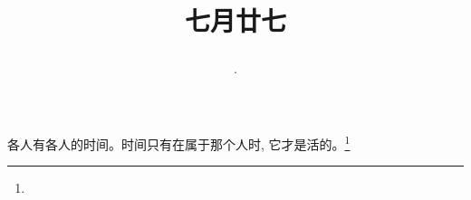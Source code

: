 \title{\date[d=30,m=8,y=2024][year:cn-y,年,month:cn,day:cn,日,·,weekday]·七月廿七 }
各人有各人的时间。时间只有在属于那个人时, 它才是活的。\footnote{ }

